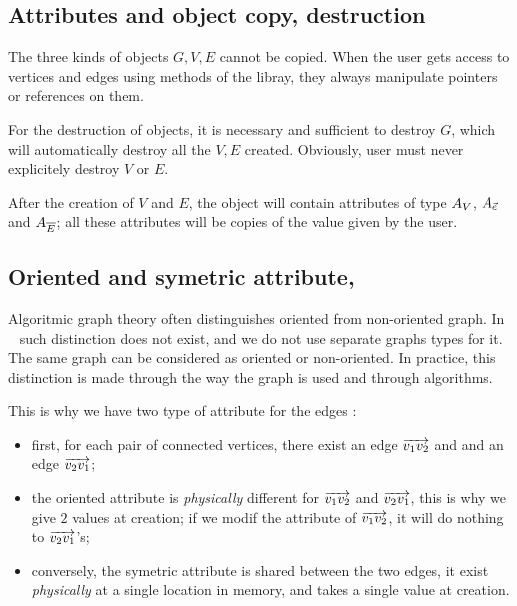 
\subsection{Attributes and object copy, destruction}

The three kinds of objects $G,V,E$ cannot be copied. When the user gets access
to vertices and edges  using methods of the libray, they always manipulate pointers or references
on them. 

For the destruction of objects, it is necessary and sufficient to destroy $G$, 
which will automatically destroy all the $V,E$ created.  Obviously,  user must never
explicitely destroy $V$ or $E$.

After the creation of $V$ and $E$, the object will contain attributes  of type $A_V$, $A_{\vec{e}}$ and $A_{\overline{E}}$;
all these attributes will be copies of the value given by the user.


\subsection{Oriented and symetric attribute,}

\label{Gr:Attr:SymOr}

Algoritmic graph theory often distinguishes oriented from non-oriented graph.  In \PPP~ 
such distinction does not exist, and we do not use separate graphs types for it.  The same
graph can be considered as oriented or non-oriented. In practice, this distinction is made through 
the way the graph is used and through algorithms.

This is why we have two type of attribute for the edges : 

\begin{itemize}
   \item first, for each pair of connected vertices, there exist an edge  $\overrightarrow{v_1 v_2}$ and
         and an edge $\overrightarrow{v_2 v_1}$;

   \item the oriented attribute is \emph{physically} different for  $\overrightarrow{v_1 v_2}$
         and $\overrightarrow{v_2 v_1}$,  this is why we give $2$ values at creation;  if we
         modif the attribute of  $\overrightarrow{v_1 v_2}$, it will do nothing to  $\overrightarrow{v_2 v_1}$'s;

   \item conversely, the symetric attribute is   shared between the two edges, it exist
         \emph{physically} at a single location in memory,  and takes a single value at creation.
  
\end{itemize}

